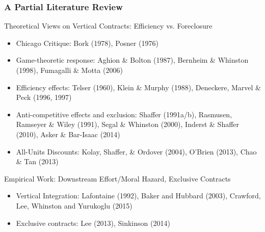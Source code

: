 \documentclass[aspectratio=169]{beamer}
\begin{document}
\begin{frame}
\frametitle{A Partial Literature Review}
\small
Theoretical Views on Vertical Contracts: Efficiency vs. Foreclosure
\footnotesize
\begin{itemize}
\item Chicago Critique: Bork (1978), Posner (1976)
\item Game-theoretic response: Aghion \& Bolton (1987), Bernheim \& Whinston (1998), Fumagalli \& Motta (2006)
\item Efficiency effects: Telser (1960), Klein \& Murphy (1988), Deneckere, Marvel \& Peck (1996, 1997)
\item Anti-competitive effects and exclusion: Shaffer (1991a/b), Rasmusen, Ramseyer \& Wiley (1991), Segal \& Whinston (2000), Inderst \& Shaffer (2010), Asker \& Bar-Isaac (2014)
\item All-Units Discounts: Kolay, Shaffer, \& Ordover (2004), O'Brien (2013), Chao \& Tan (2013)
\end{itemize}
\small
Empirical Work: Downstream Effort/Moral Hazard, Exclusive Contracts
\footnotesize
\begin{itemize}
\item Vertical Integration: Lafontaine (1992), Baker and Hubbard (2003), Crawford, Lee, Whinston and Yurukoglu (2015)
\item Exclusive contracts: Lee (2013), Sinkinson (2014)
\end{itemize}
\end{frame}


\end{document}
